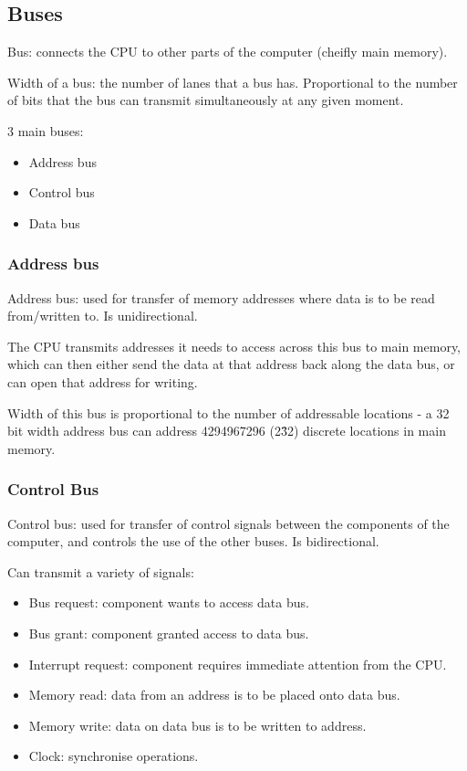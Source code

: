 \documentclass[a4paper]{report}
\begin{document}
\subsection{Buses}

Bus: connects the CPU to other parts of the computer (cheifly main memory).

Width of a bus: the number of lanes that a bus has. Proportional to the number
of bits that the bus can transmit simultaneously at any given moment.

3 main buses:

\begin{itemize}
	\item{Address bus}
	\item{Control bus}
	\item{Data bus}
\end{itemize}

\subsubsection{Address bus}

Address bus: used for transfer of memory addresses where data is to be read
from/written to. Is unidirectional.

The CPU transmits addresses it needs to access across this bus to main memory,
which can then either send the data at that address back along the data bus,
or can open that address for writing.

Width of this bus is proportional to the number of addressable locations -
a 32 bit width address bus can address 4294967296 (2\^32) discrete locations
in main memory.

\subsubsection{Control Bus}

Control bus: used for transfer of control signals between the components of
the computer, and controls the use of the other buses. Is bidirectional.

Can transmit a variety of signals:

\begin{itemize}
	\item{Bus request: component wants to access data bus.}
	\item{Bus grant: component granted access to data bus.}
	\item{Interrupt request: component requires immediate attention from
		the CPU.}
	\item{Memory read: data from an address is to be placed onto data
		bus.}
	\item{Memory write: data on data bus is to be written to address.}
	\item{Clock: synchronise operations.}
\end{itemize}
\end{document}
